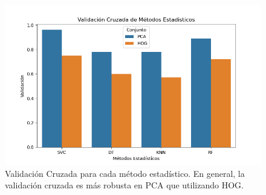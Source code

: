 \documentclass[twocolumn]{article}
\begin{document}
\begin{figure}[H] 
  \centering
  \includegraphics[width=0.97\columnwidth]{ValColectiva.png} 
  \caption{Validación Cruzada para cada método estadístico. En general, la validación cruzada es más robusta en PCA que utilizando HOG. }
  \label{fig:val} 
\end{figure}
\vspace{-16pt}
\end{document}

